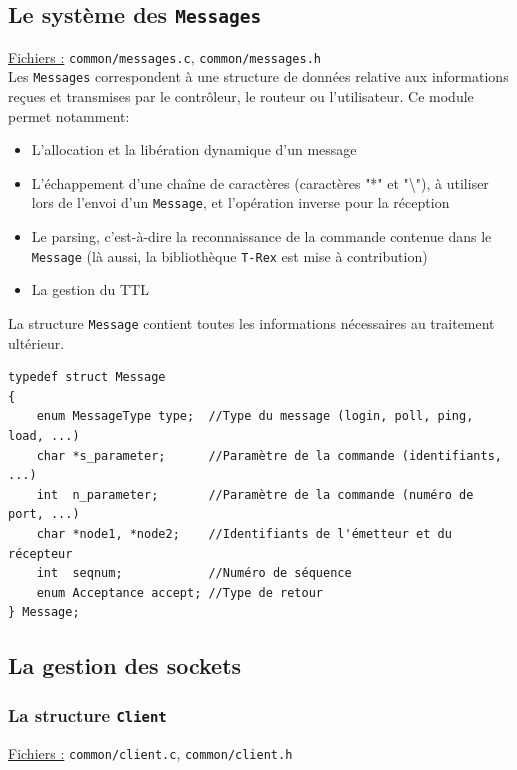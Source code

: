 \documentclass[a4paper,11pt]{article}
\begin{document}
\subsection{Le système des \texttt{Messages}}
\label{message}

\underline{Fichiers :} \texttt{common/messages.c}, \texttt{common/messages.h}\\

Les \texttt{Messages} correspondent à une structure de données relative aux informations reçues et transmises par le contrôleur, le routeur ou l'utilisateur. Ce module permet notamment:
\begin{itemize}
 \item L'allocation et la libération dynamique d'un message
 \item L'échappement d'une chaîne de caractères (caractères "*" et "\textbackslash"), à utiliser lors de l'envoi d'un \texttt{Message}, et l'opération inverse pour la réception
 \item Le parsing, c'est-à-dire la reconnaissance de la commande contenue dans le \texttt{Message} (là aussi, la bibliothèque \texttt{T-Rex} est mise à contribution)
 \item La gestion du TTL
\end{itemize}
La structure \texttt{Message} contient toutes les informations nécessaires au traitement ultérieur.

\begin{lstlisting}
typedef struct Message
{
	enum MessageType type;  //Type du message (login, poll, ping, load, ...)
	char *s_parameter;      //Paramètre de la commande (identifiants, ...)
	int  n_parameter;       //Paramètre de la commande (numéro de port, ...)
	char *node1, *node2;    //Identifiants de l'émetteur et du récepteur
	int  seqnum;            //Numéro de séquence
	enum Acceptance accept; //Type de retour
} Message;
\end{lstlisting}

\subsection{La gestion des sockets}

\subsubsection{La structure \texttt{Client}}

\underline{Fichiers :} \texttt{common/client.c}, \texttt{common/client.h}\\
\end{document}
